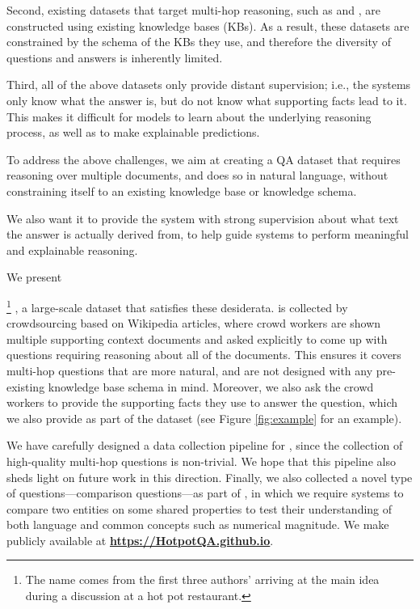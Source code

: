 Second, existing datasets that target multi-hop reasoning, such as \wikihop{} \cite{welbl2017constructing} and \complexwebq{} \cite{talmor2018web}, are constructed using existing knowledge bases (KBs). As a result, these datasets are constrained by the schema of the KBs they use, and therefore the diversity of questions and answers is inherently limited.

Third, all of the above datasets only provide distant supervision; i.e., the systems only know what the answer is, but do not know what supporting facts lead to it. This makes it difficult for models to learn about the underlying reasoning process, as well as to make explainable predictions.

To address the above challenges, we aim at creating a QA dataset that requires reasoning over multiple documents, and does so in natural language, without constraining itself to an existing knowledge base or knowledge schema.

We also want it to provide the system with strong supervision about what text the answer is actually derived from, to help guide systems to perform meaningful and explainable reasoning.

We present \datasetname

\footnote{The name comes from the first three authors' arriving at the main idea during a discussion at a hot pot restaurant.} , a large-scale dataset that satisfies these desiderata.
\datasetname{} is collected by crowdsourcing based on Wikipedia articles, where crowd workers are shown multiple supporting context documents and asked explicitly to come up with questions requiring reasoning about all of the documents. This ensures it covers multi-hop questions that are more natural, and are not designed with any pre-existing knowledge base schema in mind. Moreover, we also ask the crowd workers to provide the supporting facts they use to answer the question, which we also provide as part of the dataset (see Figure \ref{fig:example} for an example).

We have carefully designed a data collection pipeline for \datasetname, since  the collection of high-quality multi-hop questions is non-trivial. We hope that this pipeline also sheds light on future work in this direction. Finally, we also collected a novel type of questions---comparison questions---as part of \datasetname, in which we require systems to compare two entities on some shared properties to test their understanding of both language and common concepts such as numerical magnitude. We make \datasetname{} publicly available at \href{https://hotpotqa.github.io}{\bf https://HotpotQA.github.io}.

